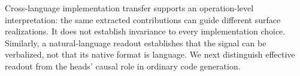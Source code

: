 Cross-language implementation transfer supports an operation-level interpretation: the same extracted contributions can guide different surface realizations. It does not establish invariance to every implementation choice. Similarly, a natural-language readout establishes that the signal can be verbalized, not that its native format is language. We next distinguish effective readout from the heads' causal role in ordinary code generation.
